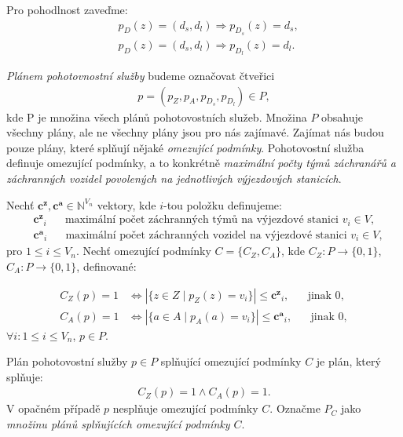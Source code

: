 Pro pohodlnost zaveďme:
\begin{align*}
  & p_D(z) = (d_s, d_l) \Rightarrow p_{D_s}(z) = d_s, \\
  & p_D(z) = (d_s, d_l) \Rightarrow p_{D_l}(z) = d_l.
\end{align*}

\textit{Plánem pohotovnostní služby} budeme označovat 
čtveřici
\begin{align*}
  p = (p_Z, p_A, p_{D_{s}}, p_{D_{l}}) \in P,
\end{align*}
kde P je množina všech plánů pohotovostních služeb.
Množina $P$ obsahuje všechny plány, ale ne všechny plány jsou pro nás zajímavé.
Zajímat nás budou pouze plány, které splňují nějaké \textit{omezující podmínky}.
Pohotovostní služba definuje omezující podmínky, a to konkrétně \textit{maximální počty týmů záchranářů a záchranných vozidel povolených na jednotlivých výjezdových stanicích}.
\begin{definice}
  Nechť $\mathbf{c^z}, \mathbf{c^a} \in \mathbb{N}^{V_n}$ vektory, 
  kde $i$-tou položku definujeme:
  \begin{align*}
    &\mathbf{c^z}_i \hspace{20pt} \text{maximální počet záchranných týmů na výjezdové stanici $v_i \in V$}, \\ 
    &\mathbf{c^a}_i \hspace{20pt} \text{maximální počet záchranných vozidel na výjezdové stanici $v_i \in V$},
  \end{align*}
  pro $1 \leq i \leq V_n$.
  Nechť omezující podmínky $C = \{ C_Z, C_A \}$, kde $C_Z \colon P \rightarrow \{ 0, 1 \}$, $C_A \colon P \rightarrow \{ 0, 1 \}$, definované:

  \begin{align*}
    C_Z(p) = 1 &\iff |\{ z \in Z \mid p_Z(z) = v_i \}| \leq \mathbf{c^z}_i, \hspace{20pt} \text{jinak 0}, \\
    C_A(p) = 1 &\iff |\{ a \in A \mid p_A(a) = v_i \}| \leq \mathbf{c^a}_i, \hspace{20pt} \text{jinak 0},
  \end{align*}
  $\forall i \colon 1 \leq i \leq V_n$, $p \in P$.
\end{definice}

Plán pohotovostní služby $p \in P$ splňující omezující podmínky $C$ je plán, který splňuje:
\begin{align*}
    C_Z(p) = 1 \land C_A(p) = 1.
\end{align*}
V opačném případě $p$ nesplňuje omezující podmínky $C$.
Označme $P_C$ jako \textit{množinu plánů splňujících omezující podmínky $C$}.

